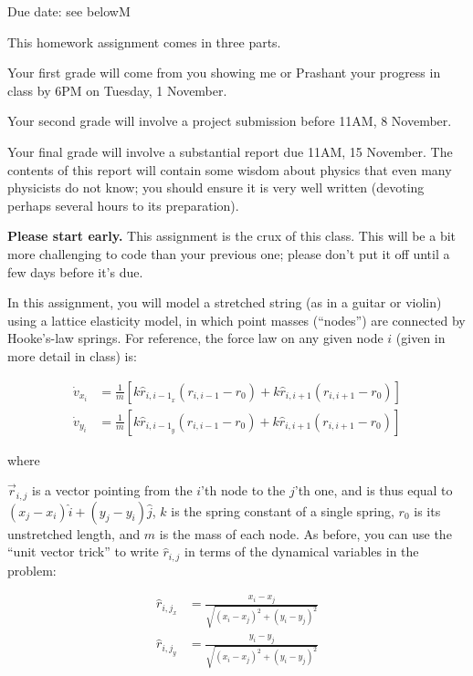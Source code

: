 \documentclass[12pt]{article}
\begin{document}
\Large
\centerline{}
\centerline{Due date: see belowM}
\normalsize

This homework assignment comes in three parts.

Your first grade will come from you showing me or Prashant your progress in class by 6PM on Tuesday, 1 November.

Your second grade will involve a project submission before 11AM, 8 November.

Your final grade will involve a substantial report due 11AM, 15 November. The contents of this report will contain some wisdom about physics that even many physicists
do not know; you should ensure it is very well written (devoting perhaps several hours to its preparation).

{\bf Please start early.} This assignment is the crux of this class.
This will be a bit more challenging to code than your previous one; please don't put it off until a few days before it's due.

In this assignment, you will model a stretched string (as in a guitar or violin) using a lattice elasticity model, in which point masses (``nodes'') are connected by Hooke's-law springs.
For reference, the force law on any given node $i$ (given in more detail in class) is:

\begin{align}
  \dot v_{x_i} &= \frac{1}{m} \left[ k \hat r_{{i,i-1}_x} (r_{i,i-1} - r_0) + k \hat r_{i,i+1} (r_{i,i+1} - r_0) \right] \\
  \dot v_{y_i} &= \frac{1}{m} \left[ k \hat r_{{i,i-1}_y} (r_{i,i-1} - r_0) + k \hat r_{i,i+1} (r_{i,i+1} - r_0) \right]
\end{align}

where

$\vec r_{i,j}$ is a vector pointing from the $i$'th node to the $j$'th one, and is thus equal to $(x_j-x_i)\hat i + (y_j-y_i)\hat j$, $k$ is the spring constant of a single spring, $r_0$ is its unstretched length, and $m$ is the mass of each node.
As before, you can use the ``unit vector trick'' to write $\hat r_{i,j}$ in terms of the dynamical variables in the problem:

\begin{align}
  \hat r_{{i,j}_x} &= \frac{x_i - x_j}{\sqrt{(x_i-x_j)^2 + (y_i-y_j)^2}}\\
  \hat r_{{i,j}_y} &= \frac{y_i - y_j}{\sqrt{(x_i-x_j)^2 + (y_i-y_j)^2}}
\end{align}
\end{document}
